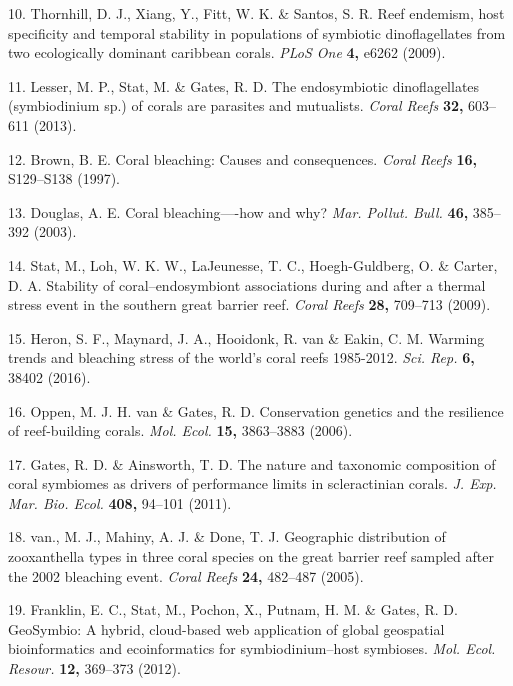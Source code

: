 \documentclass[]{article}
\begin{document}
\hypertarget{ref-Thornhill2009-jh}{}
10. Thornhill, D. J., Xiang, Y., Fitt, W. K. \& Santos, S. R. Reef
endemism, host specificity and temporal stability in populations of
symbiotic dinoflagellates from two ecologically dominant caribbean
corals. \emph{PLoS One} \textbf{4,} e6262 (2009).

\hypertarget{ref-Lesser2013-dj}{}
11. Lesser, M. P., Stat, M. \& Gates, R. D. The endosymbiotic
dinoflagellates (symbiodinium sp.) of corals are parasites and
mutualists. \emph{Coral Reefs} \textbf{32,} 603--611 (2013).

\hypertarget{ref-Brown1997-mf}{}
12. Brown, B. E. Coral bleaching: Causes and consequences. \emph{Coral
Reefs} \textbf{16,} S129--S138 (1997).

\hypertarget{ref-Douglas2003-nr}{}
13. Douglas, A. E. Coral bleaching----how and why? \emph{Mar. Pollut.
Bull.} \textbf{46,} 385--392 (2003).

\hypertarget{ref-Stat2009-qq}{}
14. Stat, M., Loh, W. K. W., LaJeunesse, T. C., Hoegh-Guldberg, O. \&
Carter, D. A. Stability of coral--endosymbiont associations during and
after a thermal stress event in the southern great barrier reef.
\emph{Coral Reefs} \textbf{28,} 709--713 (2009).

\hypertarget{ref-Heron2016-am}{}
15. Heron, S. F., Maynard, J. A., Hooidonk, R. van \& Eakin, C. M.
Warming trends and bleaching stress of the world's coral reefs
1985-2012. \emph{Sci. Rep.} \textbf{6,} 38402 (2016).

\hypertarget{ref-Van_Oppen2006-qf}{}
16. Oppen, M. J. H. van \& Gates, R. D. Conservation genetics and the
resilience of reef-building corals. \emph{Mol. Ecol.} \textbf{15,}
3863--3883 (2006).

\hypertarget{ref-Gates2011-zy}{}
17. Gates, R. D. \& Ainsworth, T. D. The nature and taxonomic
composition of coral symbiomes as drivers of performance limits in
scleractinian corals. \emph{J. Exp. Mar. Bio. Ecol.} \textbf{408,}
94--101 (2011).

\hypertarget{ref-Van2005-di}{}
18. van., M. J., Mahiny, A. J. \& Done, T. J. Geographic distribution of
zooxanthella types in three coral species on the great barrier reef
sampled after the 2002 bleaching event. \emph{Coral Reefs} \textbf{24,}
482--487 (2005).

\hypertarget{ref-Franklin2012-sz}{}
19. Franklin, E. C., Stat, M., Pochon, X., Putnam, H. M. \& Gates, R. D.
GeoSymbio: A hybrid, cloud-based web application of global geospatial
bioinformatics and ecoinformatics for symbiodinium--host symbioses.
\emph{Mol. Ecol. Resour.} \textbf{12,} 369--373 (2012).
\end{document}

